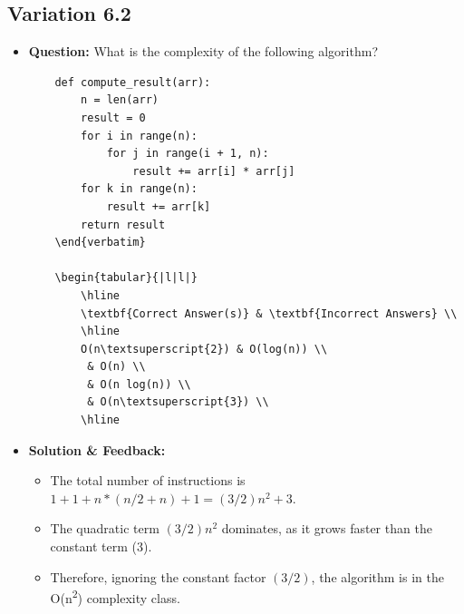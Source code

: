 \subsection{Variation 6.2}
\begin{itemize}
    \item \textbf{Question:} What is the complexity of the following algorithm?
    
    \begin{lstlisting}
    def compute_result(arr):
        n = len(arr)
        result = 0
        for i in range(n):
            for j in range(i + 1, n):
                result += arr[i] * arr[j]
        for k in range(n):
            result += arr[k]
        return result
    \end{verbatim}
    
    \begin{tabular}{|l|l|}
        \hline
        \textbf{Correct Answer(s)} & \textbf{Incorrect Answers} \\
        \hline
        O(n\textsuperscript{2}) & O(log(n)) \\
         & O(n) \\
         & O(n log(n)) \\
         & O(n\textsuperscript{3}) \\
        \hline
    \end{lstlisting}
    
    \item \textbf{Solution \& Feedback:}
    \begin{itemize}
        \item The total number of instructions is \( 1 + 1 + n * (n/2 + n) + 1 = (3/2)n^2 + 3 \).
        \item The quadratic term \((3/2)n^2\) dominates, as it grows faster than the constant term (3).
        \item Therefore, ignoring the constant factor \((3/2)\), the algorithm is in the O(n\textsuperscript{2}) complexity class.
    \end{itemize}
\end{itemize}

